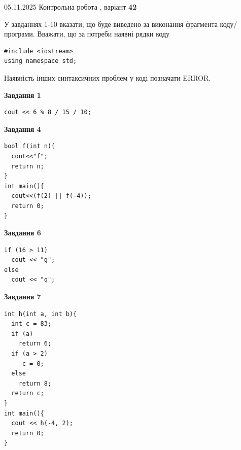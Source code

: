 \documentclass[12pt, ukrainian]{article}
\begin{document}
\newpage

{\Large{05.11.2025 Контрольна робота , варіант  \No \textbf { 42 }\par}}
{
\begin {large}
У завданнях 1-10 вказати, що буде виведено за виконання фрагмента коду/про\-гра\-ми.
Вважати, що за потреби наявні рядки коду
\begin{verbatim}
#include <iostream>
using namespace std;
\end{verbatim}
Наявність інших синтаксичних проблем у коді позначати ERROR.

\begin{minipage}[t]{7.0cm}

\begin{center}
\textbf{Завдання 1}
\end{center}
\vspace{-8mm}

\begin{verbatim}
cout << 6 % 8 / 15 / 10;
\end{verbatim}



\begin{center}
\textbf{Завдання 4}
\end{center}
\vspace{-8mm}

\begin{verbatim}
bool f(int n){
  cout<<"f";
  return n;
}
int main(){
  cout<<(f(2) || f(-4));
  return 0;
}
\end{verbatim}



\begin{center}
\textbf{Завдання 6}
\end{center}
\vspace{-8mm}

\begin{verbatim}
if (16 > 11)
  cout << "g";
else
  cout << "q";
\end{verbatim}



\begin{center}
\textbf{Завдання 7}
\end{center}
\vspace{-8mm}

\begin{verbatim}
int h(int a, int b){
  int c = 83;
  if (a)
    return 6;
  if (a > 2)
     c = 0;
  else
    return 8;
  return c;
}
int main(){
  cout << h(-4, 2);
  return 0;
}
\end{verbatim}


\end{minipage}
\end{large}}
\end{document}
